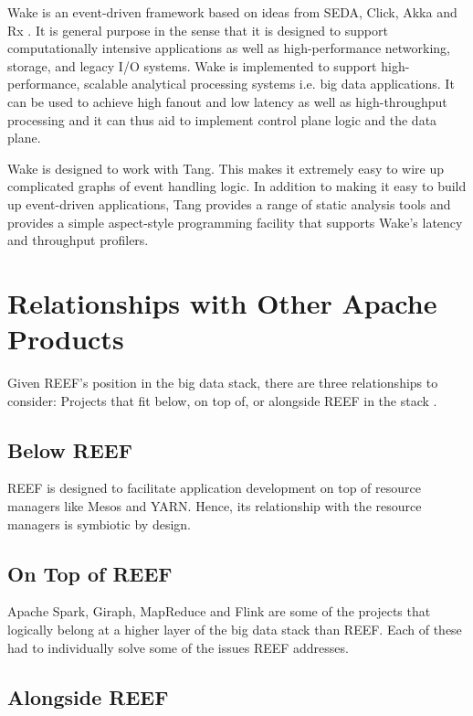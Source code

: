 \documentclass[9pt,twocolumn,twoside]{../../styles/osajnl}
\begin{document}
Wake is an event-driven framework based on ideas from SEDA, Click,
Akka and Rx \cite{reefwake}. It is general purpose in the sense that
it is designed to support computationally intensive applications as
well as high-performance networking, storage, and legacy I/O
systems. Wake is implemented to support high-performance, scalable
analytical processing systems i.e. big data applications. It can be
used to achieve high fanout and low latency as well as high-throughput
processing and it can thus aid to implement control plane logic and
the data plane.

Wake is designed to work with Tang. This makes it extremely easy to
wire up complicated graphs of event handling logic. In addition to
making it easy to build up event-driven applications, Tang provides a
range of static analysis tools and provides a simple aspect-style
programming facility that supports Wake’s latency and throughput
profilers.
\section{Relationships with Other Apache Products}

Given REEF's position in the big data stack, there are three
relationships to consider: Projects that fit below, on top of, or
alongside REEF in the stack \cite{reefproposal}.

\subsection{Below REEF}
REEF is designed to facilitate application development on top of
resource managers like Mesos and YARN. Hence, its relationship with
the resource managers is symbiotic by design.

\subsection{On Top of REEF}
Apache Spark, Giraph, MapReduce and Flink are some of the projects
that logically belong at a higher layer of the big data stack than
REEF. Each of these had to individually solve some of the issues REEF
addresses.

\subsection{Alongside REEF}
\end{document}
